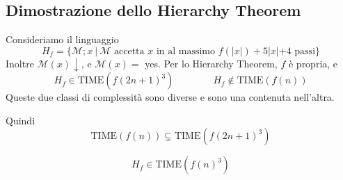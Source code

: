 \subsection{Dimostrazione dello Hierarchy Theorem}
Consideriamo il linguaggio 
$$
    H_f = \{ \mathcal{M};x ~|~ \mathcal{M} \text{ accetta $x$ in al massimo } f(|x|)+5|x|+4 \text{ passi}  \}
$$
Inoltre $\mathcal{M}(x)\downarrow$, e $\mathcal{M}(x)=$ yes. Per lo Hierarchy Theorem, $f$ è propria, e 
$$
    H_f\in\text{TIME}\left(f(2n+1)^3\right)
    \qquad \qquad
    H_f\notin\text{TIME}(f(n))
$$
Queste due classi di complessità sono diverse e sono una contenuta nell'altra. 
\begin{center}
\end{center}
Quindi
$$
    \text{TIME}(f(n)) \subsetneq \text{TIME}\left(f(2n+1)^3\right)
$$

\begin{lemma}
    $$
        H_f \in \text{TIME}(f(n)^3)
    $$
\end{lemma}
